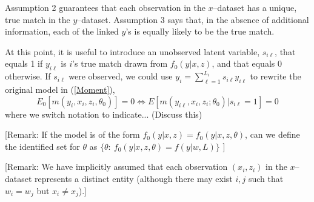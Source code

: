\documentclass[12pt]{article}
\begin{document}
Assumption 2 guarantees that each observation in the $x$--dataset has a unique, true match  in the $y$--dataset.  Assumption 3 says that, in the absence of
additional information, each of the linked $y$'s is equally
likely to be the true match. 

At this point, it is useful to introduce an unobserved latent variable, $s_{i\ell}$, that equals 1 if $y_{i\ell}$ is $i$'s true match drawn from $f_0(y|x,z)$, and that equals 0 otherwise.  If $s_{i\ell}$ were observed,  we could use $y_i = \sum_{\ell=1}^{L_i} s_{i\ell} y_{i\ell}$ to rewrite the original model in (\ref{Moment}),
\begin{equation} E_0\left[m(y_i, x_i, z_i, \theta_0 )\right] = 0 \iff %
E\left[m(y_{i\ell},x_i,z_i; \theta_0) | s_{i\ell} =1 \right] = 0  \label{truemodel} \end{equation} 
where we switch notation to indicate... (Discuss this)

[Remark: If the model is of the form $f_0(y | x,z) = f_0(y | x,z,\theta)$, can we define the identified set for $\theta$ as $\{ \theta:\ f_0(y | x, z, \theta) = f(y | w, L)\}$ ]
 


[Remark: We have implicitly assumed that each observation $(x_i, z_i)$ in the $x$--dataset represents a distinct entity (although there may exist $i, j$ such that $w_i=w_j$ but $x_i \neq x_j$).]
\end{document}

